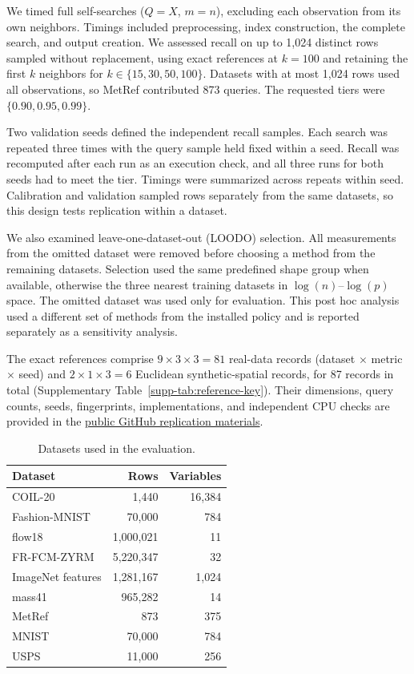 \documentclass[article]{jss}
\begin{document}
We timed full self-searches ($Q=X$, $m=n$), excluding each observation from
its own neighbors. Timings included preprocessing, index construction, the
complete search, and output creation. We assessed recall on up to 1,024
distinct rows sampled without replacement, using exact references at $k=100$
and retaining the first $k$ neighbors for $k\in\{15,30,50,100\}$. Datasets
with at most 1,024 rows used all observations, so MetRef contributed 873
queries. The requested tiers were $\{0.90,0.95,0.99\}$.

Two validation seeds defined the independent recall samples. Each search was
repeated three times with the query sample held fixed within a seed. Recall was
recomputed after each run as an execution check, and all three runs for both
seeds had to meet the tier. Timings were summarized across repeats within seed.
Calibration and validation sampled rows separately from the same datasets, so
this design tests replication within a dataset.

We also examined leave-one-dataset-out (LOODO) selection. All measurements
from the omitted dataset were removed before choosing a method from the
remaining datasets. Selection used the same predefined shape group when
available, otherwise the three nearest training datasets in
$\log(n)$--$\log(p)$ space. The omitted dataset was used only for evaluation.
This post hoc analysis used a different set of methods from the installed
policy and is reported separately as a sensitivity analysis.

The exact references comprise $9\times3\times3=81$ real-data records
(dataset $\times$ metric $\times$ seed) and $2\times1\times3=6$ Euclidean
synthetic-spatial records, for 87 records in total
(Supplementary Table~\ref{supp-tab:reference-key}).
Their dimensions, query counts, seeds, fingerprints, implementations, and
independent CPU checks are provided in the
\href{https://github.com/tkcaccia/faissR/tree/main/manuscript/jss}{public
GitHub replication materials}.

\begin{table}[t]
\centering

\begin{tabular}{@{}lrr@{}}
\toprule
Dataset & Rows & Variables \\
\midrule
COIL-20 & 1,440 & 16,384 \\
Fashion-MNIST & 70,000 & 784 \\
flow18 & 1,000,021 & 11 \\
FR-FCM-ZYRM & 5,220,347 & 32 \\
ImageNet features & 1,281,167 & 1,024 \\
mass41 & 965,282 & 14 \\
MetRef & 873 & 375 \\
MNIST & 70,000 & 784 \\
USPS & 11,000 & 256 \\
\bottomrule
\end{tabular}
\caption{Datasets used in the evaluation.}
\label{tab:datasets}
\end{table}
\end{document}
